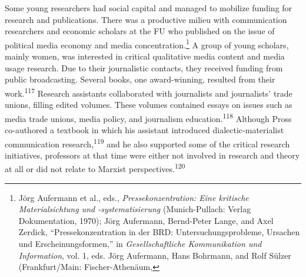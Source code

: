 \documentclass{tufte-handout}
\begin{document}
Some young researchers had social capital and managed to mobilize
funding for research and publications. There was a productive milieu
with communication researchers and economic scholars at the FU who
published on the issue of political media economy and media
concentration.\footnote{Jörg Aufermann et al., eds.,
  \emph{Pressekonzentration: Eine kritische Materialsichtung und
  -systematisierung} (Munich-Pullach: Verlag Dokumentation, 1970); Jörg
  Aufermann, Bernd-Peter Lange, and Axel Zerdick, ``Pressekonzentration
  in der BRD: Untersuchungsprobleme, Ursachen und Erscheinungsformen,''
  in \emph{Gesellschaftliche Kommunikation und Information}, vol. 1,
  eds. Jörg Aufermann, Hans Bohrmann, and Rolf Sülzer (Frankfurt/Main:
  Fischer-Athenäum,} A group of young scholars, mainly women, was
interested in critical qualitative media content and media usage
research. Due to their journalistic contacts, they received funding from
public broadcasting. Several books, one award-winning, resulted from
their work.\textsuperscript{117} Research
assistants collaborated with journalists and journalists' trade unions,
filling edited volumes. These volumes contained essays on issues such as
media trade unions, media policy, and journalism education.\textsuperscript{118} Although Pross co-authored a textbook in which
his assistant introduced dialectic-materialist communication
research,\textsuperscript{119} and he
also supported some of the critical research initiatives, professors at
that time were either not involved in research and theory at all or did
not relate to Marxist perspectives.\textsuperscript{120}
\end{document}
